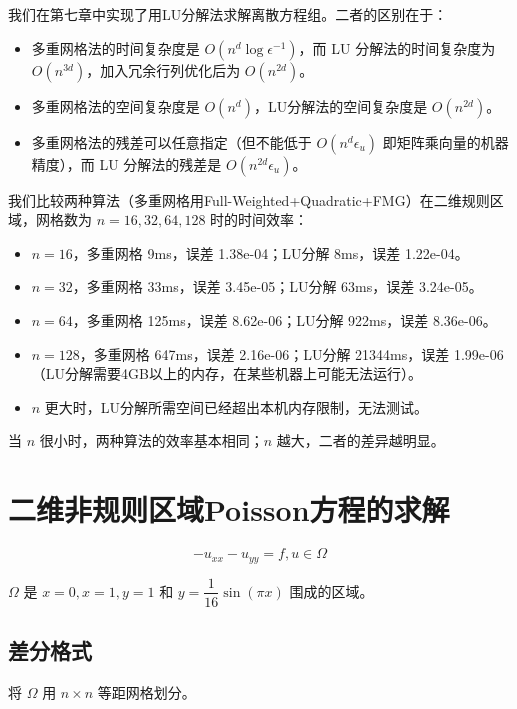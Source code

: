 \documentclass{ctexart}
\begin{document}
我们在第七章中实现了用LU分解法求解离散方程组。二者的区别在于：

\begin{itemize}
	\item 多重网格法的时间复杂度是 $O(n^d\log \epsilon^{-1})$，而 LU 分解法的时间复杂度为 $O(n^{3d})$，加入冗余行列优化后为 $O(n^{2d})$。
	\item 多重网格法的空间复杂度是 $O(n^d)$，LU分解法的空间复杂度是 $O(n^{2d})$。
	\item 多重网格法的残差可以任意指定（但不能低于 $O(n^d\epsilon_u)$ 即矩阵乘向量的机器精度），而 LU 分解法的残差是 $O(n^{2d}\epsilon_u)$。
\end{itemize}

我们比较两种算法（多重网格用Full-Weighted+Quadratic+FMG）在二维规则区域，网格数为 $n=16,32,64,128$ 时的时间效率：

\begin{itemize}
	\item $n=16$，多重网格 9ms，误差 1.38e-04；LU分解 8ms，误差 1.22e-04。
	\item $n=32$，多重网格 33ms，误差 3.45e-05；LU分解 63ms，误差 3.24e-05。
	\item $n=64$，多重网格 125ms，误差 8.62e-06；LU分解 922ms，误差 8.36e-06。
	\item $n=128$，多重网格 647ms，误差 2.16e-06；LU分解 21344ms，误差 1.99e-06（LU分解需要4GB以上的内存，在某些机器上可能无法运行）。
	\item $n$ 更大时，LU分解所需空间已经超出本机内存限制，无法测试。
\end{itemize}

当 $n$ 很小时，两种算法的效率基本相同；$n$ 越大，二者的差异越明显。

\section{二维非规则区域Poisson方程的求解}

\begin{equation}
	-u_{xx}-u_{yy} = f, u\in\Omega
\end{equation}

$\Omega$ 是 $x=0,x=1,y=1$ 和 $y=\dfrac 1{16}\sin(\pi x)$ 围成的区域。

\subsection{差分格式}

将 $\Omega$ 用 $n\times n$ 等距网格划分。
\end{document}
